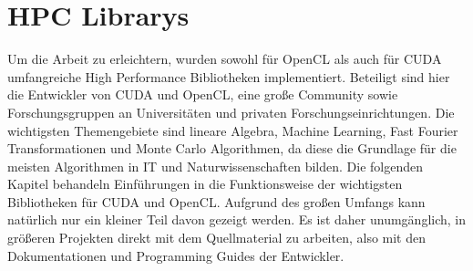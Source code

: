 	\chapter{HPC Librarys}	
	Um die Arbeit zu erleichtern, wurden sowohl für OpenCL als auch für CUDA umfangreiche High Performance Bibliotheken implementiert. Beteiligt sind hier die Entwickler von CUDA und OpenCL, eine große Community sowie Forschungsgruppen an Universitäten und privaten Forschungseinrichtungen. Die wichtigsten Themengebiete sind lineare Algebra, Machine Learning, Fast Fourier Transformationen und Monte Carlo Algorithmen, da diese die Grundlage für die meisten Algorithmen in IT und Naturwissenschaften bilden. Die folgenden Kapitel behandeln Einführungen in die Funktionsweise der wichtigsten Bibliotheken für CUDA und OpenCL. Aufgrund des großen Umfangs kann natürlich nur ein kleiner Teil davon gezeigt werden. Es ist daher unumgänglich, in größeren Projekten direkt mit dem Quellmaterial zu arbeiten, also mit den Dokumentationen und Programming Guides der Entwickler.
	\newpage	
	
	\startcontents[THRUST]
			
	\stopcontents[THRUST]
		
	\newpage
		
		
	\newpage
	
		
	\newpage
	

